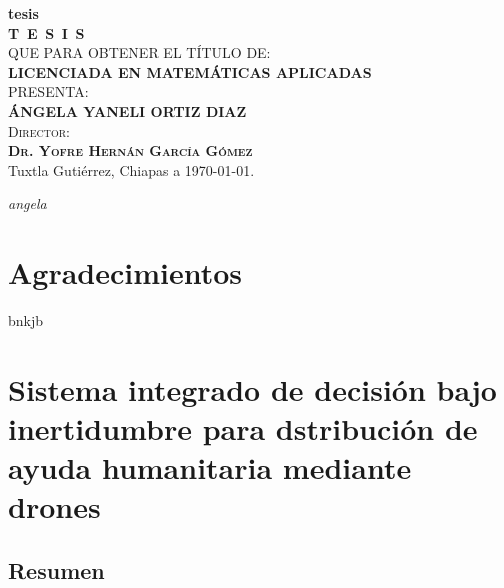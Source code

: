 \documentclass[
  spanish,
  us-letterpaper,
]{scrreprt}
\numberwithin{equation}{section}
\renewcommand*\contentsname{Tabla de contenidos}
\newcommand\contentsname{Tabla de contenidos}
\begin{document}
\begin{titlepage}
\begin{minipage}[t][0.95\textheight][c]{0.76\textwidth}
            \begin{center}
                {\Large\bfseries tesis}\\[2cm]
                \textsc{\huge \textbf{T\, E\, S\, I\, S}}\\[1.5cm]
                \textsc{\large QUE PARA OBTENER EL TÍTULO DE:}\\[0.3cm]
                \textbf{\textsc{LICENCIADA EN MATEMÁTICAS APLICADAS}}\\[1.5cm]
                \textsc{\large PRESENTA:}\\[0.3cm]
                \textbf{\textsc{\large {ÁNGELA YANELI ORTIZ DIAZ}}}\\[2cm]
                {\large\scshape Director:\\[0.3cm]
                {\textbf{\large Dr. Yofre Hernán García Gómez }}}\\[2.0cm]
                \large{Tuxtla Gutiérrez, Chiapas a \today.}

            \end{center}
\end{minipage}
\end{titlepage}

\pagebreak[2]

\begin{center}
\itshape
\setlength{\parindent}{0pt} %
\setlength{\parskip}{1.2\baselineskip} %
angela
\end{center}
\chapter*{Agradecimientos}
bnkjb

\renewcommand*\contentsname{Tabla de contenidos}
{
\hypersetup{linkcolor=}
\setcounter{tocdepth}{2}
\tableofcontents
}


\chapter{Sistema integrado de decisión bajo inertidumbre para
dstribución de ayuda humanitaria mediante drones}\label{sistema-integrado-de-decisiuxf3n-bajo-inertidumbre-para-dstribuciuxf3n-de-ayuda-humanitaria-mediante-dronesuxf1redes-de-transporte-centralidad-pagerank-y-pronuxf3stico-advectivo-en-chiapas}

\section*{Resumen}\label{resumen}
\end{document}

